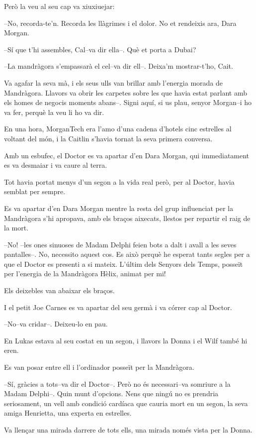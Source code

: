 Però la veu al seu cap va xiuxiuejar:

--No, recorda-te'n. Recorda les llàgrimes i el dolor. No et rendeixis
ara, Dara Morgan.

--Sí que t'hi assembles, Cal--va dir ella--. Què et porta a Dubai?

--La mandràgora s'empassarà el cel--va dir ell--. Deixa'm mostrar-t'ho,
Cait.

Va agafar la seva mà, i els seus ulls van brillar amb l'energia morada
de Mandràgora. Llavors va obrir les carpetes sobre les que havia estat
parlant amb els homes de negocis moments abans--. Signi aquí, si us
plau, senyor Morgan--i ho va fer, perquè la veu li ho va dir.

En una hora, MorganTech era l'amo d'una cadena d'hotels cinc estrelles
al voltant del món, i la Caitlin s'havia tornat la seva primera
conversa.

Amb un esbufec, el Doctor es va apartar d'en Dara Morgan, qui
immediatament es va desmaiar i va caure al terra.

Tot havia portat menys d'un segon a la vida real però, per al Doctor,
havia semblat per sempre.

Es va apartar d'en Dara Morgan mentre la resta del grup influenciat per
la Mandràgora s'hi apropava, amb els braços aixecats, llestos per
repartir el raig de la mort.

--No! --les ones sinuoses de Madam Delphi feien bots a dalt i avall a
les seves pantalles--. No, necessito aquest cos. Es això perquè he
esperat tants segles per a que el Doctor es presenti a si mateix.
L'últim dels Senyors dels Temps, posseït per l'energia de la Mandràgora
Hèlix, animat per mi!

Els deixebles van abaixar els braços.

I el petit Joe Carnes es va apartar del seu germà i va córrer cap al
Doctor.

--No--va cridar--. Deixeu-lo en pau.

En Lukas estava al seu costat en un segon, i llavors la Donna i el Wilf
també hi eren.

Es van posar entre ell i l'ordinador posseït per la Mandràgora.

--Sí, gràcies a tots--va dir el Doctor--. Però no és necessari--va
somriure a la Madam Delphi--. Quin munt d'opcions. Nens que ningú no es
prendria seriosament, un vell amb condició cardíaca que cauria mort en
un segon, la seva amiga Henrietta, una experta en estrelles.

Va llençar una mirada darrere de tots ells, una mirada només vista per
la Donna.


